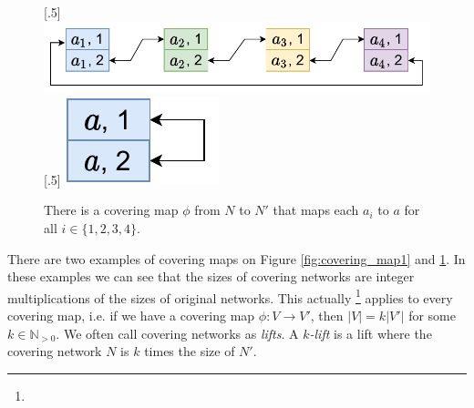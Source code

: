 \begin{figure}[H]
    [.5\linewidth] {
    \centering
    \includegraphics[scale=0.55]{diagrams/covering_map_3.pdf}
  }
  \hfill
    [.5\linewidth] {
    \centering
    \includegraphics[scale=0.55]{diagrams/covering_map_4.pdf}
  }
  \caption{There is a covering map $\phi$ from $N$ to $N'$ that maps each $a_i$ to $a$ for all $i \in \{1, 2, 3, 4\}$.
  }
  \label{fig:covering_map2}
\end{figure}

There are two examples of covering maps on Figure \ref{fig:covering_map1} and \ref{fig:covering_map2}.
In these examples we can see that the sizes of covering networks are integer multiplications of the sizes of original networks.
This actually
\footnote{}
applies to every covering map, i.e. if we have a covering map $\phi\colon V \rightarrow V'$, then $|V| = k|V'|$ for some $k \in \mathbb{N}_{>0}$.
We often call covering networks as \emph{lifts}.
A \emph{$k$-lift} is a lift where the covering network $N$ is $k$ times the size of $N'$.




